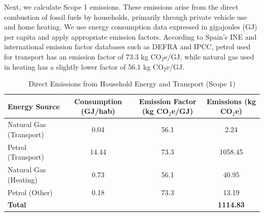 \documentclass[12pt,a4paper]{article}%
\begin{document}
\begin{table}[h]
\centering
\caption{Mean Consumption Expenditure per Household in Spain, 2022}
\label{tab:expenditure}
\end{table}

Next, we calculate Scope 1 emissions. These emissions arise from the direct combustion of fossil fuels by households, primarily through private vehicle use and home heating. We use energy consumption data expressed in gigajoules (GJ) per capita and apply appropriate emission factors. According to Spain’s INE and international emission factor databases such as DEFRA and IPCC, petrol used for transport has an emission factor of 73.3 kg CO$_2$e/GJ, while natural gas used in heating has a slightly lower factor of 56.1 kg CO$_2$e/GJ.

\begin{table}[h]
\centering
\caption{Direct Emissions from Household Energy and Transport (Scope 1)}
\label{tab:scope1}
\begin{tabular}{|l|c|c|c|}
\hline
\textbf{Energy Source} & \textbf{Consumption (GJ/hab)} & \textbf{Emission Factor (kg CO$_2$e/GJ)} & \textbf{Emissions (kg CO$_2$e)} \\
\hline
Natural Gas (Transport) & 0.04 & 56.1 & 2.24 \\
Petrol (Transport) & 14.44 & 73.3 & 1058.45 \\
Natural Gas (Heating) & 0.73 & 56.1 & 40.95 \\
Petrol (Other) & 0.18 & 73.3 & 13.19 \\
\hline
\textbf{Total} & & & \textbf{1114.83} \\
\hline
\end{tabular}
\end{table}
\end{document}
